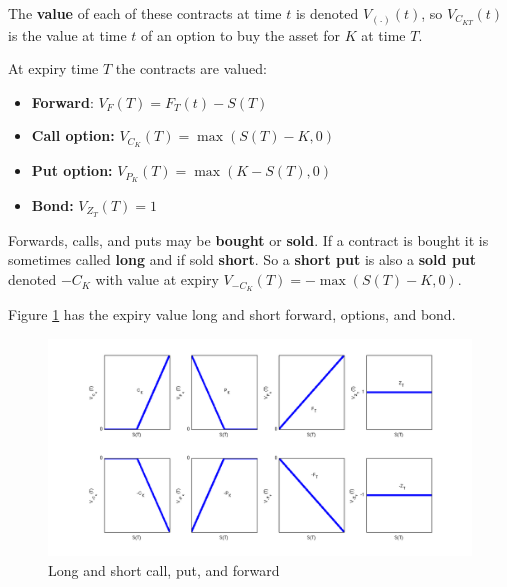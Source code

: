 The \textbf{value} of each of these contracts at time $t$ is denoted $V_{(.)}(t)$, so $V_{C_{KT}}(t)$ is the value at time $t$ of an option to buy the asset for $K$ at time $T$. 

At expiry time $T$ the contracts are valued:

\begin{itemize}
\item[] \textbf{Forward}: $V_{F}(T) = F_T(t)-S(T)$ \\
\item[] \textbf{Call option:} $V_{C_K}(T) = \max(S(T)-K,0)$\\
\item[] \textbf{Put option:} $V_{P_K}(T) =\max(K-S(T),0)$\\
\item[] \textbf{Bond:} $V_{Z_T}(T) = 1$
\end{itemize}


Forwards, calls, and puts may be \textbf{bought} or \textbf{sold}. If a contract is bought it is sometimes called \textbf{long} and if sold \textbf{short}. So a \textbf{short put} is also a \textbf{sold put} denoted $-C_{K}$ with value at expiry $V_{-C_K}(T) = -\max(S(T)-K,0)$. 

Figure \ref{fig:genericCPFZ} has the expiry value  long and short forward, options, and bond. 


 \begin{figure}[ht]
\centering
  \includegraphics[width=5in] {pics/genericCPFZ}
\caption{Long and short call, put, and forward}
\label{fig:genericCPFZ}
\end{figure}


